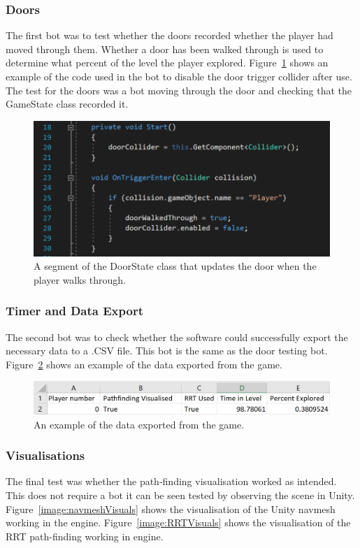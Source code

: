 \documentclass[journal]{IEEEtran}
\begin{document}
	\subsubsection{Doors}
	The first bot was to test whether the doors recorded whether the player had moved through them. Whether a door has been walked through is used to determine what percent of the level the player explored. Figure~\ref{image:DoorCode} shows an example of the code used in the bot to disable the door trigger collider after use. The test for the doors was a bot moving through the door and checking that the GameState class recorded it.
	
	\begin{figure}[h]
		\includegraphics[width=1.0\linewidth]{DoorCode.png}
		\caption{A segment of the DoorState class that updates the door when the player walks through.}
		\label{image:DoorCode}
	\end{figure} 
	
	\subsubsection{Timer and Data Export}
	The second bot was to check whether the software could successfully export the necessary data to a .CSV file. This bot is the same as the door testing bot. Figure~\ref{image:ExportData} shows an example of the data exported from the game.  
	
	\begin{figure}[h]
		\includegraphics[width=1.0\linewidth]{ExportData.png}
		\caption{An example of the data exported from the game.}
		\label{image:ExportData}
	\end{figure} 
	
	\subsubsection{Visualisations}
	The final test was whether the path-finding visualisation worked as intended. This does not require a bot it can be seen tested by observing the scene in Unity. Figure~\ref{image:navmeshVisuals} shows the visualisation of the Unity navmesh working in the engine.  Figure~\ref{image:RRTVisuals} shows the visualisation of the RRT path-finding working in engine.
	
\end{document}
